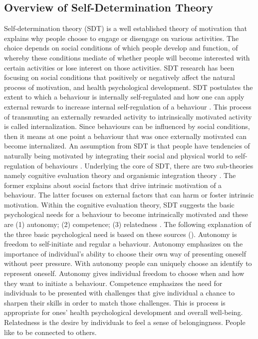\documentclass{sig-alternate}
\begin{document}
\subsection{Overview of Self-Determination Theory}
Self-determination theory (SDT)\cite{deci1985:intrinsic} is a well established theory of motivation that explains why people choose to engage or disengage on various activities. The choice depends on social conditions of which people develop and function, of whereby these conditions mediate of whether people will become interested with certain activities or lose interest on those activities. SDT research has been focusing on social conditions that positively or negatively affect the natural process of motivation, and health psychological development\cite{ryan2000:self}. SDT postulates the extent to which a behaviour is internally self-regulated and how one can apply external rewards to increase internal self-regulation of a behaviour \cite{ryan2000:self}. This process of transmuting an externally rewarded activity to intrinsically motivated activity is called internalization. Since behaviours can be influenced by social conditions, then it means at one point a behaviour that was once externally motivated can become internalized.\newline
An assumption from SDT is that people have tendencies of naturally being motivated by integrating their social and physical world to self-regulation of behaviours \cite{lee2015:relating}. Underlying the core of SDT, there are two sub-theories namely cognitive evaluation theory and organismic integration theory \cite{ryan2000:self}. The former explains about social factors that drive intrinsic motivation of a behaviour. The latter focuses on external factors that can harm or foster intrinsic motivation.\newline  
Within the cognitive evaluation theory, SDT suggests the basic psychological needs for a behaviour to become intrinsically motivated and these are (1) autonomy; (2) competence; (3) relatedness \cite{deci1985:intrinsic}.\newline
The following explanation of the three basic psychological need is based on these sources (\cite{deci1985:intrinsic,ryan2000:self,lee2015:relating}). Autonomy is freedom to self-initiate and regular a behaviour. Autonomy emphasizes on the importance of individual's ability to choose their own way of presenting oneself without peer pressure. With autonomy people can uniquely choose an identify to represent oneself. Autonomy gives individual freedom to choose when and how they want to initiate a behaviour. Competence emphasizes the need for individuals to be presented with challenges that give individual a chance to sharpen their skills in order to match those challenges. This is process is appropriate for ones' health psychological development and  overall well-being. Relatedness is the desire by individuals to feel a sense of belongingness. People like to be connected to others. \newline  
\end{document}

